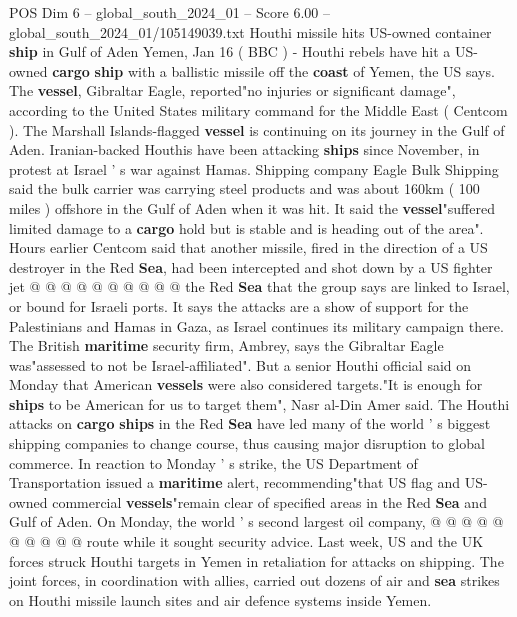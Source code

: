 \begin{textsample}{POS Dim 6 – global\_south\_2024\_01 – Score 6.00 – global\_south\_2024\_01/105149039.txt}  \label{ex:f6_pos_100}
Houthi missile hits US-owned container \textbf{ship} in Gulf of Aden Yemen, Jan 16 ( BBC ) - Houthi rebels have hit a US-owned \textbf{cargo} \textbf{ship} with a ballistic missile off the \textbf{coast} of Yemen, the US says.
The \textbf{vessel}, Gibraltar Eagle, reported"no injuries or significant damage", according to the United States military command for the Middle East ( Centcom ).
The Marshall Islands-flagged \textbf{vessel} is continuing on its journey in the Gulf of Aden.
Iranian-backed Houthis have been attacking \textbf{ships} since November, in protest at Israel ' s war against Hamas.
Shipping company Eagle Bulk Shipping said the bulk carrier was carrying steel products and was about 160km ( 100 miles ) offshore in the Gulf of Aden when it was hit.
It said the \textbf{vessel}"suffered limited damage to a \textbf{cargo} hold but is stable and is heading out of the area".
Hours earlier Centcom said that another missile, fired in the direction of a US destroyer in the Red \textbf{Sea}, had been intercepted and shot down by a US fighter jet @ @ @ @ @ @ @ @ @ @ the Red \textbf{Sea} that the group says are linked to Israel, or bound for Israeli ports.
It says the attacks are a show of support for the Palestinians and Hamas in Gaza, as Israel continues its military campaign there.
The British \textbf{maritime} security firm, Ambrey, says the Gibraltar Eagle was"assessed to not be Israel-affiliated".
But a senior Houthi official said on Monday that American \textbf{vessels} were also considered targets."It is enough for \textbf{ships} to be American for us to target them", Nasr al-Din Amer said.
The Houthi attacks on \textbf{cargo} \textbf{ships} in the Red \textbf{Sea} have led many of the world ' s biggest shipping companies to change course, thus causing major disruption to global commerce.
In reaction to Monday ' s strike, the US Department of Transportation issued a \textbf{maritime} alert, recommending"that US flag and US-owned commercial \textbf{vessels}"remain clear of specified areas in the Red \textbf{Sea} and Gulf of Aden.
On Monday, the world ' s second largest oil company, @ @ @ @ @ @ @ @ @ @ route while it sought security advice.
Last week, US and the UK forces struck Houthi targets in Yemen in retaliation for attacks on shipping.
The joint forces, in coordination with allies, carried out dozens of air and \textbf{sea} strikes on Houthi missile launch sites and air defence systems inside Yemen.

\end{textsample}
